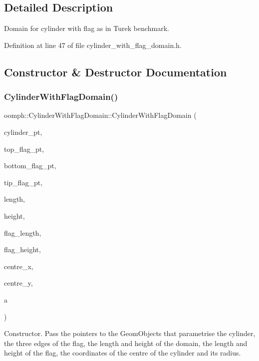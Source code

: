 \subsection{Detailed Description}
Domain for cylinder with flag as in Turek benchmark. 

Definition at line 47 of file cylinder\+\_\+with\+\_\+flag\+\_\+domain.\+h.



\subsection{Constructor \& Destructor Documentation}
\mbox{\label{classoomph_1_1CylinderWithFlagDomain_aa393d14243edaf8b8eaa02c9a01bd869}} 
\subsubsection{\texorpdfstring{Cylinder\+With\+Flag\+Domain()}{CylinderWithFlagDomain()}}
{\footnotesize\ttfamily oomph\+::\+Cylinder\+With\+Flag\+Domain\+::\+Cylinder\+With\+Flag\+Domain (\begin{DoxyParamCaption}\item[{Circle $\ast$}]{cylinder\+\_\+pt,  }\item[{Geom\+Object $\ast$}]{top\+\_\+flag\+\_\+pt,  }\item[{Geom\+Object $\ast$}]{bottom\+\_\+flag\+\_\+pt,  }\item[{Geom\+Object $\ast$}]{tip\+\_\+flag\+\_\+pt,  }\item[{const double \&}]{length,  }\item[{const double \&}]{height,  }\item[{const double \&}]{flag\+\_\+length,  }\item[{const double \&}]{flag\+\_\+height,  }\item[{const double \&}]{centre\+\_\+x,  }\item[{const double \&}]{centre\+\_\+y,  }\item[{const double \&}]{a }\end{DoxyParamCaption})}

Constructor. Pass the pointers to the Geom\+Objects that parametrise the cylinder, the three edges of the flag, the length and height of the domain, the length and height of the flag, the coordinates of the centre of the cylinder and its radius.

